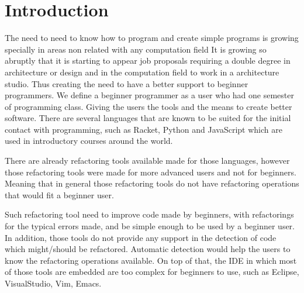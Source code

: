 \section{Introduction}






The need to  need to know how to program and create simple programs is growing
specially in areas non related with any computation field %
It is growing so abruptly that it is starting to appear job proposals requiring
a double degree in architecture or design and in the computation field
to work in a architecture studio. %
Thus creating the need to have a better support to beginner programmers.
We define a beginner programmer as a user who had one semester of programming class. %
Giving the users the tools and the means to create better software.
There are several languages that are known to be suited for the initial contact
with programming, such as Racket, Python and JavaScript which are used in introductory
courses around the world.

There are already refactoring tools available made for those languages, %
however those refactoring tools were made for more advanced users and not for beginners.
Meaning that in general those refactoring tools do not have refactoring operations that %
would fit a beginner user. %

Such refactoring tool need to improve code made by beginners, with refactorings for %
the typical errors made, and be simple enough to be used by a beginner user.
In addition, those tools do not provide any support in the detection of code which might/should
be refactored.
Automatic detection would help the users to know the refactoring operations available.
On top of that, the IDE in which most of those tools are embedded are too complex for beginners
to use, such as Eclipse, VisualStudio, Vim, Emacs. %

